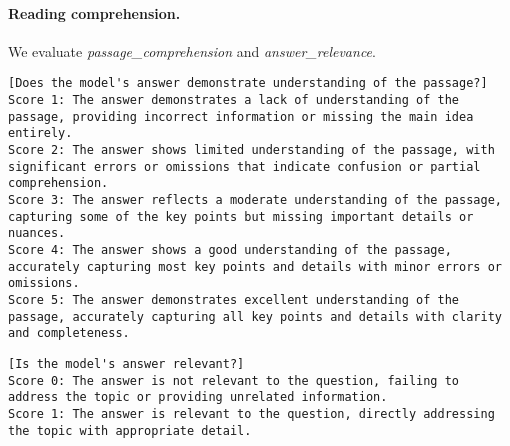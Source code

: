 \paragraph{Reading comprehension.} We evaluate \emph{passage\_comprehension} and \emph{answer\_relevance}.
\begin{lstlisting}[label=lst:judge_rubrics_read1,caption={Rubric used for the \emph{passage\_comprehension} criterion.}]
[Does the model's answer demonstrate understanding of the passage?]
Score 1: The answer demonstrates a lack of understanding of the passage, providing incorrect information or missing the main idea entirely.
Score 2: The answer shows limited understanding of the passage, with significant errors or omissions that indicate confusion or partial comprehension.
Score 3: The answer reflects a moderate understanding of the passage, capturing some of the key points but missing important details or nuances.
Score 4: The answer shows a good understanding of the passage, accurately capturing most key points and details with minor errors or omissions.
Score 5: The answer demonstrates excellent understanding of the passage, accurately capturing all key points and details with clarity and completeness.
\end{lstlisting}
\begin{lstlisting}[label=lst:judge_rubrics_read2,caption={Rubric used for the \emph{answer\_relevance} criterion.}]
[Is the model's answer relevant?]
Score 0: The answer is not relevant to the question, failing to address the topic or providing unrelated information.
Score 1: The answer is relevant to the question, directly addressing the topic with appropriate detail.
\end{lstlisting}

